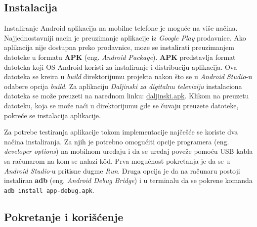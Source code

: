 \documentclass[implementacija.tex]{subfiles}
\begin{document}
\subsection{Instalacija}
Instaliranje Android aplikacija na mobilne telefone je moguće na više načina. Najjednostavniji nacin je preuzimanje aplikacije iz \textit{Google Play} prodavnice. Ako aplikacija nije dostupna preko prodavnice, moze se instalirati preuzimanjem datoteke u formatu \textbf{APK} (eng. \textit{Android Package}). \textbf{APK} predstavlja format datoteka koji OS Android koristi za instaliranje i distribuciju aplikacija. Ova datoteka se kreira u \textit{build} direktorijumu projekta nakon što se u \textit{Android Studio}-u odabere opcija \textit{build}. Za aplikaciju \textit{Daljinski za digitalnu televiziju} instalaciona datoteka se može preuzeti na narednom linku: \hyperlink{https://drive.google.com/file/d/1gBlfRibn4jrFDe3TTBCsHUq9MDowEBty/view?usp=drive_link}{daljinski.apk}. Klikom na preuzetu datoteku, koja se može naći u direktorijumu gde se čuvaju preuzete datoteke, pokreće se instalacija aplikacije.

Za potrebe testiranja aplikacije tokom implementacije najčešće se koriste dva načina instaliranja. Za njih je potrebno omogućiti opcije programera (eng. \textit{developer options}) na mobilnom uređaju i da se uređaj poveže pomoću USB kabla sa računarom na kom se nalazi k\^{o}d. Prva mogućnost pokretanja je da se u \textit{Android Studio}-u pritisne dugme \textit{Run}. Druga opcija je da na računaru postoji instaliran \textbf{adb} (eng. \textit{Android Debug Bridge}) i u terminalu da se pokrene komanda \verb|adb install app-debug.apk|. 

\subsection{Pokretanje i korišćenje}
\end{document}
